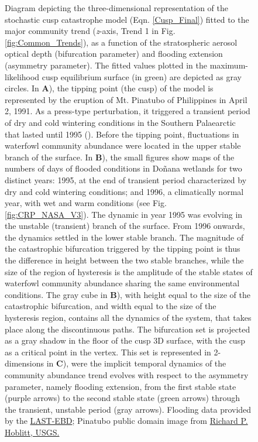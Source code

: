 \documentclass[12pt]{article}
\begin{document}
\begin{figure}[t]
		\caption[Three-dimensional diagram of the fitted stochastic cusp catastrophe model]{{\scriptsize{} Diagram depicting the three-dimensional representation of the stochastic cusp catastrophe model (Eqn. \ref{Cusp_Final}) fitted to the major community trend (\textit{z}-axis, Trend 1 in Fig. \ref{fig:Common_Trends}), as a function of the stratospheric aerosol optical depth (bifurcation parameter) and flooding extension (asymmetry parameter). The fitted values plotted in the maximum-likelihood cusp equilibrium surface (in green) are depicted as gray circles. In \textbf{A}), the tipping point (the cusp) of the model is represented by the eruption of Mt. Pinatubo of Philippines in April 2, 1991. As a press-type perturbation, it triggered a transient period of dry and cold wintering conditions in the Southern Palaearctic that lasted until 1995 (\cite{Robock2002}). Before the tipping point, fluctuations in waterfowl community abundance were located in the upper stable branch of the surface. In \textbf{B}), the small figures show maps of the numbers of days of flooded conditions in Doñana wetlands for two distinct years: 1995, at the end of transient period characterized by dry and cold wintering conditions; and 1996, a climatically normal year, with wet and warm conditions (see Fig. \ref{fig:CRP_NASA_V3}). The dynamic in year 1995 was evolving in the unstable (transient) branch of the surface. From 1996 onwards, the dynamics settled in the lower stable branch. The magnitude of the catastrophic bifurcation triggered by the tipping point is thus the difference in height between the two stable branches, while the size of the region of hysteresis is the amplitude of the stable states of waterfowl community abundance sharing the same environmental conditions. The gray cube in \textbf{B}), with height equal to the size of the catastrophic bifurcation, and width equal to the size of the hysteresis region, contains all the dynamics of the system, that takes place along the discontinuous paths. The bifurcation set is projected as a gray shadow in the floor of the cusp 3D surface, with the cusp as a critical point in the vertex. This set is represented in 2-dimensions in \textbf{C}), were the implicit temporal dynamics of the community abundance trend evolves with respect to the asymmetry parameter, namely flooding extension, from the first stable state (purple arrows) to the second stable state (green arrows) through the transient, unstable period (gray arrows). Flooding data provided by the \href{http://www.ebd.csic.es/web/last/inicio}{LAST-EBD}; Pinatubo public domain image from \href{https://commons.wikimedia.org/wiki/File:Pinatubo_Ausbruch_1991.jpg}{Richard P. Hoblitt, USGS.}}}
		\label{fig:Cusp_Surface}
	\end{figure}
\end{document}
